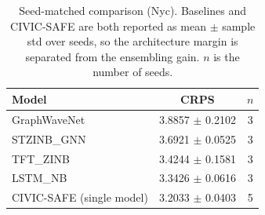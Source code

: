 \begin{table}[t]
\centering
\caption{Seed-matched comparison (Nyc). Baselines and CIVIC-SAFE are both reported as mean $\pm$ sample std over seeds, so the architecture margin is separated from the ensembling gain. $n$ is the number of seeds.}
\label{tab:seed_matched_nyc}
\begin{tabular}{lcc}
\toprule
Model & CRPS & $n$ \\
\midrule
GraphWaveNet & 3.8857 $\pm$ 0.2102 & 3 \\
STZINB\_GNN & 3.6921 $\pm$ 0.0525 & 3 \\
TFT\_ZINB & 3.4244 $\pm$ 0.1581 & 3 \\
LSTM\_NB & 3.3426 $\pm$ 0.0616 & 3 \\
\midrule
CIVIC-SAFE (single model) & 3.2033 $\pm$ 0.0403 & 5 \\
\bottomrule
\end{tabular}
\end{table}